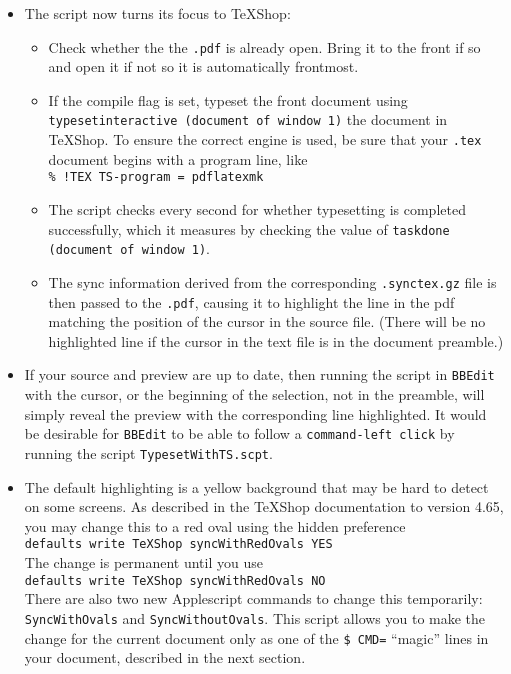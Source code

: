 \documentclass[11pt]{amsart}
\def\TeXShop{\TeX Shop\xspace}
\begin{document}
\begin{itemize}
\begin{itemize}
\item The script now turns its focus to \TeXShop:
\begin{itemize}
\item Check whether the the {\tt.pdf} is already open. Bring it to the front if so and open it if not so it is automatically frontmost.
\item If the compile flag is set, typeset the front document using {\tt typesetinteractive  (document of window 1)} the document in \TeXShop. To ensure the correct engine is used, be sure that your {\tt.tex} document begins with a program line, like\\
\verb|% !TEX TS-program = pdflatexmk|
\item The script checks every  second for whether typesetting is completed successfully, which it measures by checking the value of \verb|taskdone (document of window 1)|.
\item The sync information derived from the corresponding {\tt.synctex.gz} file is then passed to the {\tt.pdf}, causing it to highlight the line in the pdf matching the position of the cursor in the source file. (There will be no highlighted line if the cursor in the text file is in the document preamble.)

\end{itemize} %
\item If your source and preview are up to date, then running the script in {\tt BBEdit} with the cursor, or the beginning of the selection, not in the preamble, will simply reveal  the preview with the corresponding line highlighted. It would be desirable for {\tt BBEdit} to be able to follow a {\tt command-left click} by running the script {\tt TypesetWithTS.scpt}.
\item The default highlighting is a yellow background that may be hard to detect on some screens. As described in the \TeXShop documentation to version 4.65, you may change this to a red oval using the hidden preference\\
\verb|defaults write TeXShop syncWithRedOvals YES|\\
The change is permanent until you use \\
\verb|defaults write TeXShop syncWithRedOvals NO|\\
There are also two new Applescript commands to change this temporarily: {\tt SyncWithOvals} and {\tt SyncWithoutOvals}. This script allows you to make the change for  the current document only as one of the \verb|$ CMD=| ``magic'' lines in your document, described in the next section.

\end{itemize} %
\end{itemize}
\end{document}
